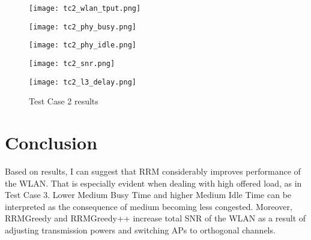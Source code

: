 \begin{figure}[!ht]
    \centering
    \begin{minipage}[b]{0.48\textwidth}
        \centering
        \texttt{[image: tc2\_wlan\_tput.png]}
        \label{fig:tc2:tput}
    \end{minipage}
    \hfill
    \begin{minipage}[b]{0.48\textwidth}
        \centering
        \texttt{[image: tc2\_phy\_busy.png]}
        \label{fig:tc2:busy}
    \end{minipage}
    
    \vspace{0.1em}
    
    \begin{minipage}[b]{0.48\textwidth}
        \centering
        \texttt{[image: tc2\_phy\_idle.png]}
        \label{fig:tc2:idle}
    \end{minipage}
    \hfill
    \begin{minipage}[b]{0.48\textwidth}
        \centering
        \texttt{[image: tc2\_snr.png]}
        \label{fig:tc2:snr}
    \end{minipage}
    
    \vspace{0.1em}
    
    \begin{minipage}[b]{0.48\textwidth}
        \centering
        \texttt{[image: tc2\_l3\_delay.png]}
        \label{fig:tc2:l3delay}
    \end{minipage}
    
    \caption{Test Case 2 results}
    \label{fig:tc2:plots}
\end{figure}


\section{Conclusion}
\label{chap:impl:sec:conclusion}

Based on results, I can suggest that RRM considerably improves performance of the WLAN. That is especially evident when dealing with high offered load, as in Test Case 3. Lower Medium Busy Time and higher Medium Idle Time can be interpreted as the consequence of medium becoming less congested. Moreover, RRMGreedy and RRMGreedy++ increase total SNR of the WLAN as a result of adjusting transmission powers and switching APs to orthogonal channels.

